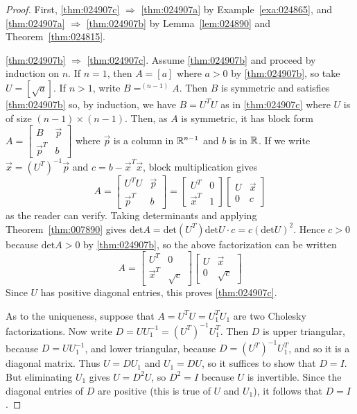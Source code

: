 \documentclass{ximera}
\begin{document}
\begin{proof}
First, \ref{thm:024907c} $\Rightarrow$ \ref{thm:024907a} by Example~\ref{exa:024865}, and \ref{thm:024907a} $\Rightarrow$ \ref{thm:024907b} by Lemma~\ref{lem:024890} and Theorem~\ref{thm:024815}.

\ref{thm:024907b} $\Rightarrow$ \ref{thm:024907c}. Assume \ref{thm:024907b} and proceed by induction on $n$. If $n = 1$, then $A = \left[ a \right]$ where $a > 0$ by \ref{thm:024907b}, so take $U = \left[ \sqrt{a} \right]$. If $n > 1$, write $B =^{(n-1)}A$. Then $B$ is symmetric and satisfies \ref{thm:024907b} so, by induction, we have $B = U^{T}U$ as in \ref{thm:024907c} where $U$ is of size $(n - 1) \times (n - 1)$. Then, as $A$ is symmetric, it has block form $A = \left[ \begin{array}{cc}
B & \vec{p} \\
\vec{p}^T & b
\end{array}\right]$ where $\vec{p}$ is a column in $\mathbb{R}^{n-1}$ and $b$ is in $\mathbb{R}$. If we write $\vec{x} = (U^{T})^{-1}\vec{p}$ and $c = b - \vec{x}^{T}\vec{x}$, block multiplication gives
\begin{equation*}
A = \left[ \begin{array}{cc}
U^TU & \vec{p} \\
\vec{p}^T & b
\end{array}\right] = \left[ \begin{array}{cc}
U^T & 0 \\
\vec{x}^T & 1
\end{array}\right] \left[ \begin{array}{cc}
U & \vec{x} \\
0 & c
\end{array}\right]
\end{equation*}
as the reader can verify. Taking determinants and applying Theorem~\ref{thm:007890} gives $\mbox{det}A = \mbox{det}(U^{T}) \mbox{det} U \cdot c = c(\mbox{det}U)^{2}$. Hence $c > 0$ because $\mbox{det}A > 0$ by \ref{thm:024907b}, so the above factorization can be written
\begin{equation*}
A = \left[ \begin{array}{cc}
U^T & 0 \\
\vec{x}^T & \sqrt{c}
\end{array}\right] \left[ \begin{array}{cc}
U & \vec{x} \\
0 & \sqrt{c}
\end{array}\right]
\end{equation*}
Since $U$ has positive diagonal entries, this proves \ref{thm:024907c}.

As to the uniqueness, suppose that $A = U^TU = U_{1}^TU_{1}$ are two Cholesky factorizations. Now write $D = UU_{1}^{-1} = (U^T)^{-1}U_{1}^T$. Then $D$ is upper triangular, because $D = UU_{1}^{-1}$, and lower triangular, because $D = (U^T)^{-1}U_{1}^T$, and so it is a diagonal matrix. Thus $U = DU_{1}$ and $U_{1} = DU$, so it suffices to show that $D = I$. But eliminating $U_{1}$ gives $U = D^{2}U$, so $D^{2} = I$ because $U$ is invertible. Since the diagonal entries of $D$ are positive (this is true of $U$ and $U_{1}$), it follows that $D = I$.
\end{proof}
\end{document}
